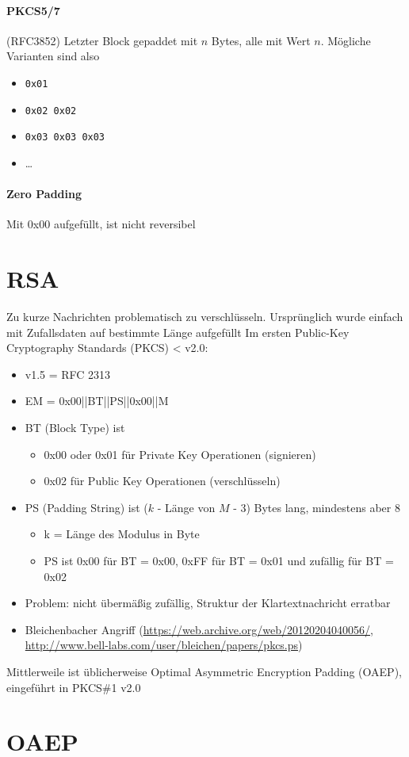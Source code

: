 \paragraph{PKCS5/7} (RFC3852) Letzter Block gepaddet mit $n$ Bytes, alle mit Wert $n$. Mögliche Varianten sind also
\begin{itemize}
    \item \verb|0x01|
    \item \verb|0x02 0x02|
    \item \verb|0x03 0x03 0x03|
    \item \ldots
\end{itemize}

\paragraph{Zero Padding} Mit 0x00 aufgefüllt, ist nicht reversibel

\section{RSA}

Zu kurze Nachrichten problematisch zu verschlüsseln. Ursprünglich wurde einfach mit Zufallsdaten auf bestimmte Länge aufgefüllt
Im ersten Public-Key Cryptography Standards (PKCS) < v2.0:
\begin{itemize}
    \item v1.5 = RFC 2313
    \item EM = 0x00||BT||PS||0x00||M
    \item BT (Block Type) ist
    \begin{itemize}
        \item 0x00 oder 0x01 für Private Key Operationen (signieren)
        \item 0x02 für Public Key Operationen (verschlüsseln)
    \end{itemize}
    \item PS (Padding String) ist ($k$ - Länge von $M$ - 3) Bytes lang, mindestens aber 8
    \begin{itemize}
        \item k = Länge des Modulus in Byte
        \item PS ist 0x00 für BT = 0x00, 0xFF für BT = 0x01 und zufällig für BT = 0x02
    \end{itemize}
    \item Problem: nicht übermäßig zufällig, Struktur der Klartextnachricht erratbar
    \item Bleichenbacher Angriff (\url{https://web.archive.org/web/20120204040056/}, \url{http://www.bell-labs.com/user/bleichen/papers/pkcs.ps})
\end{itemize}

Mittlerweile ist üblicherweise Optimal Asymmetric Encryption Padding (OAEP), eingeführt in PKCS\#1 v2.0

\section{OAEP}




